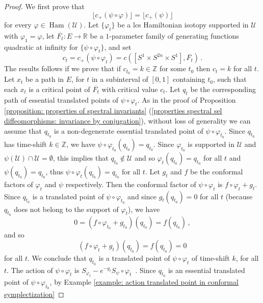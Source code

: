 \documentclass{amsart}
\DeclareMathOperator{\Ham}{Ham}
\theoremstyle{remark}
\begin{document}
\begin{proof}
We first prove that
\begin{equation}\label{equation: in proof displacement}
\lfloor c_+ (\psi \circ \varphi) \rfloor = \lfloor c_+ (\psi) \rfloor
\end{equation}
for every $\varphi \in \Ham (\mathcal{U})$.
Let $\{\varphi_t\}$ be a lcs Hamiltonian isotopy
supported in $\mathcal{U}$ with $\varphi_1 = \varphi$,
let $\overline{F_t}: E \rightarrow \mathbb{R}$ be a $1$-parameter family
of generating functions quadratic at infinity
for $\{ \psi \circ \varphi_t \}$,
and set
$$
c_t = c_+ (\psi \circ \varphi_t) = c ( [S^1 \times S^{2n} \times S^1], \overline{F_t} ) \,.
$$
The results follows if we prove that if $c_{t_0} = k \in \mathbb{Z}$ for some $t_0$ 
then $c_t = k$ for all $t$.
Let $x_t$ be a path in $E$,
for $t$ in a subinterval of $[0,1]$ containing $t_0$,
such that each $x_t$ is a critical point of $\overline{F_t}$
with critical value $c_t$.
Let $q_t$ be the corresponding path
of essential translated points of $\psi \circ \varphi_t$.
As in the proof of Proposition \ref{proposition: properties of spectral invariants}
(\ref{properties spectral sel diffeomorphisms: invariance by conjugation}),
without loss of generality we can assume that
$q_{t_0}$ is a non-degenerate essential translated point of $\psi \circ \varphi_{t_0}$.
Since $q_{t_0}$ has time-shift $k \in \mathbb{Z}$,
we have $\psi \circ \varphi_{t_0} (q_{t_0}) = q_{t_0}$.
Since $\varphi_{t_0}$ is supported in $\mathcal{U}$
and $\psi (\mathcal{U}) \cap \mathcal{U} = \emptyset$,
this implies that $q_{t_0} \notin \mathcal{U}$
and so $\varphi_t (q_{t_0}) = q_{t_0}$ for all $t$
and $\psi (q_{t_0}) = q_{t_0}$,
thus $\psi \circ \varphi_t (q_{t_0}) = q_{t_0}$ for all $t$.
Let $g_t$ and $f$ be the conformal factors
of $\varphi_t$ and $\psi$ respectively.
Then the conformal factor of $\psi \circ \varphi_t$
is $f \circ \varphi_t + g_t$.
Since $q_{t_0}$ is a translated point of $\psi \circ \varphi_{t_0}$
and since $g_t (q_{t_0}) = 0$ for all $t$
(because $q_{t_0}$ does not belong to the support of $\varphi_t$),
we have
\[
0 = (f \circ \varphi_{t_0} + g_{t_0}) (q_{t_0}) = f (q_{t_0}) \,,
\]
and so
\[
(f \circ \varphi_t + g_t) (q_{t_0}) = f(q_{t_0}) = 0
\]
for all $t$.
We conclude that $q_{t_0}$ is a translated point of $\psi \circ \varphi_t$
of time-shift $k$, for all $t$.
The action of $\psi \circ \varphi_t$
is $S_{\varphi_t} - e^{-g_t} S_{\psi} \circ \varphi_t$ \,.
Since $q_{t_0}$ is an essential translated point
of $\psi \circ \varphi_{t_0}$,
by Example \ref{example: action translated point in conformal symplectization}

\end{proof}
\end{document}
